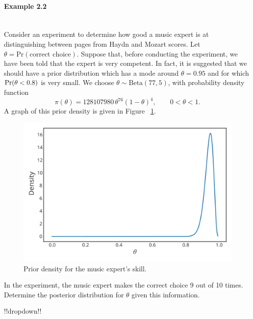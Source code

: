 \paragraph{Example 2.2}{~\\
Consider an experiment to determine how good a music expert is at \label{ex:mozart} distinguishing between pages from Haydn and Mozart scores. Let $\theta=\text{Pr}(\text{correct choice})$. Suppose that, before conducting the experiment, we have been told that the expert is very competent. In fact, it is suggested that we should have a prior distribution which has a mode around $\theta=0.95$ and for which $\textnormal{Pr}(\theta<0.8)$ is very small. We choose $\theta\sim \mathrm{Beta}(77,5)$, with probability density function
\begin{equation}
\pi(\theta)=128107980\,\theta^{76}(1-\theta)^4,\quad\quad 0<\theta<1.
\label{eq:p3}
\end{equation}
A graph of this prior density is given in Figure ~\ref{fig:betaplot3}.
\begin{figure}[ht]

\includegraphics{images/priorplot2.svg}
\caption{Prior density for the music expert's skill.}
\label{fig:betaplot3}

\end{figure}

In the experiment, the music expert makes the correct choice 9 out of 10 times. Determine the posterior distribution for $\theta$ given this information.






!!dropdown!!

}
